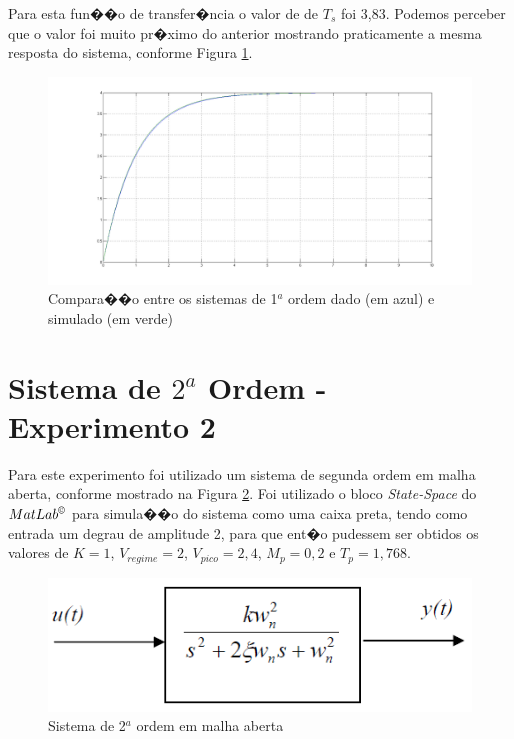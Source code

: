 \documentclass[11pt,a4paper]{report}
\begin{document}
	Para esta fun��o de transfer�ncia o valor de de $T_{s}$ foi 3,83. Podemos perceber que o valor foi muito pr�ximo do anterior mostrando praticamente a mesma resposta do sistema, conforme Figura \ref{fig:sis1ordemcomparacao}.
	
		\begin{figure}[h]
			\centering
			\includegraphics[scale=0.35]{./pictures/1ordem_direta_comparacao.png}
			\caption{Compara��o entre os sistemas de 1$^{a}$ ordem dado (em azul) e simulado (em verde)}
			\label{fig:sis1ordemcomparacao}			
		\end{figure}

\section{Sistema de $2^{a}$ Ordem - Experimento 2}
	
	Para este experimento foi utilizado um sistema de segunda ordem em malha aberta, conforme mostrado na Figura \ref{fig:sist2ordaberta}. Foi utilizado o bloco \textit{State-Space} do $MatLab^{\copyright}$ para simula��o do sistema como uma caixa preta, tendo como entrada um degrau de amplitude 2, para que ent�o pudessem ser obtidos os valores de $K = 1$, $V_{regime} = 2$, $V_{pico} = 2,4$, $M_{p} = 0,2$ e $T_{p} = 1,768$.

		\begin{figure}[h]
			\centering
			\includegraphics[scale=0.75]{./pictures/sistema_2ordem_aberta.png}
			\caption{Sistema de 2$^{a}$ ordem em malha aberta}
			\label{fig:sist2ordaberta}			
		\end{figure}
	
\end{document}
